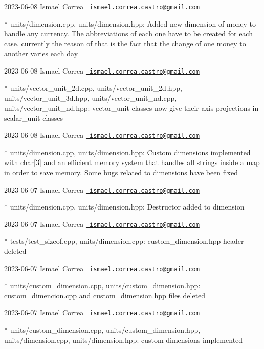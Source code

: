  2023-\/06-\/08 Ismael Correa \href{mailto:ismael.correa.castro@gmail.com}{\texttt{ ismael.\+correa.\+castro@gmail.\+com}} \begin{DoxyVerb}* units/dimension.cpp, units/dimension.hpp: Added new dimension of
money to handle any currency. The abbreviations of each one have to
be created for each case, currently the reason of that is the fact
that the change of one money to another varies each day
\end{DoxyVerb}
 2023-\/06-\/08 Ismael Correa \href{mailto:ismael.correa.castro@gmail.com}{\texttt{ ismael.\+correa.\+castro@gmail.\+com}} \begin{DoxyVerb}* units/vector_unit_2d.cpp, units/vector_unit_2d.hpp,
units/vector_unit_3d.hpp, units/vector_unit_nd.cpp,
units/vector_unit_nd.hpp: vector_unit classes now give their axis
projections in scalar_unit classes
\end{DoxyVerb}
 2023-\/06-\/08 Ismael Correa \href{mailto:ismael.correa.castro@gmail.com}{\texttt{ ismael.\+correa.\+castro@gmail.\+com}} \begin{DoxyVerb}* units/dimension.cpp, units/dimension.hpp: Custom dimensions
implemented with char[3] and an efficient memory system that handles
all strings inside a map in order to save memory. Some bugs related
to dimensions have been fixed
\end{DoxyVerb}
 2023-\/06-\/07 Ismael Correa \href{mailto:ismael.correa.castro@gmail.com}{\texttt{ ismael.\+correa.\+castro@gmail.\+com}} \begin{DoxyVerb}* units/dimension.cpp, units/dimension.hpp: Destructor added to
dimension
\end{DoxyVerb}
 2023-\/06-\/07 Ismael Correa \href{mailto:ismael.correa.castro@gmail.com}{\texttt{ ismael.\+correa.\+castro@gmail.\+com}} \begin{DoxyVerb}* tests/test_sizeof.cpp, units/dimension.cpp: custom_dimension.hpp
header deleted
\end{DoxyVerb}
 2023-\/06-\/07 Ismael Correa \href{mailto:ismael.correa.castro@gmail.com}{\texttt{ ismael.\+correa.\+castro@gmail.\+com}} \begin{DoxyVerb}* units/custom_dimension.cpp, units/custom_dimension.hpp: 
custom_dimencion.cpp and custom_dimension.hpp files deleted
\end{DoxyVerb}
 2023-\/06-\/07 Ismael Correa \href{mailto:ismael.correa.castro@gmail.com}{\texttt{ ismael.\+correa.\+castro@gmail.\+com}} \begin{DoxyVerb}* units/custom_dimension.cpp, units/custom_dimension.hpp,
units/dimension.cpp, units/dimension.hpp: custom dimensions
implemented
\end{DoxyVerb}
